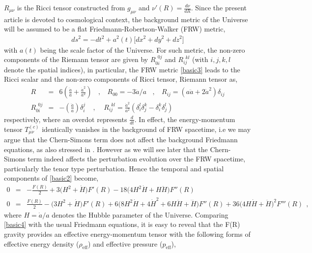 \documentclass{article}
\begin{document}
$R_{\mu\nu}$ is the Ricci tensor constructed from $g_{\mu\nu}$ and $\nu'(R) = \frac{d\nu}{dR}$. 
Since the present article is devoted to cosmological context,
the background metric of the Universe will be assumed to be a flat Friedmann-Robertson-Walker (FRW) metric,
\begin{eqnarray}
 ds^2 = -dt^2 + a^2(t)\big[dx^2 + dy^2 + dz^2\big]
 \label{basic3}
\end{eqnarray}
with $a(t)$ being the scale factor of the Universe. For such metric, the non-zero components of the Riemann tensor are given by 
$R_{0i}^{~~0j}$ and $R_{ij}^{~~kl}$ (with $i,j,k,l$ denote the spatial indices), in particular, the FRW metric \ref{basic3} leads to the Ricci 
scalar and the non-zero components of Ricci tensor, Riemann tensor as,
\begin{eqnarray}
 R&=&6\left(\frac{\ddot{a}}{a} + \frac{\dot{a}^2}{a^2}\right)~~~~,~~~~R_{00} = -3\ddot{a}/a~~~~,~~~~
 R_{ij} = \left(a\ddot{a} + 2\dot{a}^2\right)\delta_{ij}\nonumber\\
 R_{0i}^{~~0j}&=&-\left(\frac{\ddot{a}}{a}\right)\delta^{j}_{i}~~~~~,~~~~~
 R_{ij}^{~~kl} = \frac{\dot{a}^2}{a^2}\left(\delta_{i}^{l}\delta_{j}^{k} - \delta_{i}^{k}\delta_{j}^{l}\right)
 \nonumber
\end{eqnarray}
respectively, where an overdot represents $\frac{d}{dt}$. 
In effect, the energy-momentum tensor $T^{(c)}_{\mu\nu}$ identically vanishes in the background of FRW spacetime, i.e we may argue that 
the Chern-Simons term does not affect the background Friedmann equations, as also stressed in \cite{Hwang:2005hb}. However as we will see later that the 
Chern-Simons term indeed affects the perturbation evolution over the FRW spacetime, particularly the tenor type perturbation. Hence 
the temporal and spatial components of \ref{basic2} become,
\begin{eqnarray}
0&=&-\frac{F(R)}{2} + 3\big(H^2 + \dot{H}\big)F'(R) - 18\big(4H^2\dot{H} + H\ddot{H}\big)F''(R)\nonumber\\
0&=&\frac{F(R)}{2} - \big(3H^2 + \dot{H}\big)F'(R) + 6\big(8H^2\dot{H} + 4\dot{H}^2 + 6H\ddot{H}
+ \dddot{H}\big)F''(R) + 36\big(4H\dot{H} + \ddot{H}\big)^2F'''(R)~~,
\label{basic4}
\end{eqnarray}
where $H = \dot{a}/a$ denotes the Hubble parameter of the 
Universe. Comparing \ref{basic4} with the usual Friedmann equations, it is easy to 
reveal that the F(R) gravity provides an effective energy-momentum tensor with the following forms of 
effective energy density ($\rho_\mathrm{eff}$) and effective pressure ($p_\mathrm{eff}$),
\end{document}
